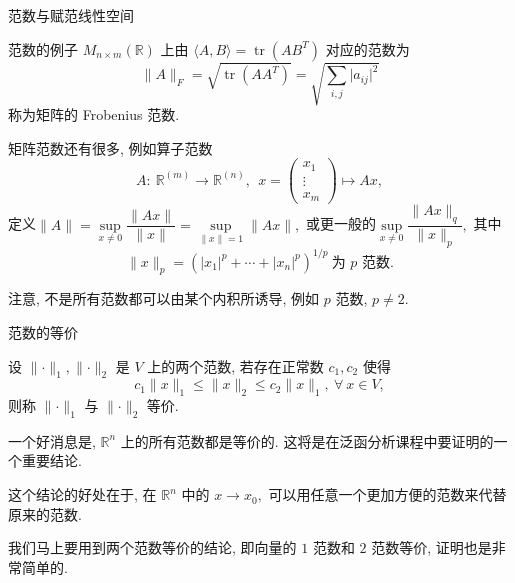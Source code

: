 \begin{frame}{范数与赋范线性空间}

\begin{block}{范数的例子}
$M_{n\times m}(\mathbb{R})$ 上由 $\langle A, B \rangle = \operatorname{tr} (AB^T)$ 对应的范数为
\[\lVert A \rVert_F = \sqrt{\operatorname{tr} (AA^T)} = \sqrt{\sum\limits_{i, j} \lvert a_{ij} \rvert^2}\]
称为矩阵的 Frobenius 范数.
\end{block}

\pause

矩阵范数还有很多, 例如算子范数
\vspace{-1em}
\[
A: ~ \mathbb{R}^{(m)} \rightarrow \mathbb{R}^{(n)}, ~~ x = \begin{pmatrix}
x_1 \\ \vdots \\ x_m
\end{pmatrix} \mapsto Ax,
\]
定义$\lVert A \rVert = \sup\limits_{x\neq 0} \dfrac{\lVert Ax \rVert}{\lVert x \rVert} = \sup\limits_{\lVert x \rVert = 1} \lVert Ax \rVert,$
\pause
或更一般的$\sup\limits_{x\neq 0} \dfrac{\lVert Ax \rVert_q}{\lVert x \rVert_p},$ 其中
\[\lVert x \rVert_p = \left( \lvert x_1 \rvert^p + \cdots + \lvert x_n \rvert^p \right)^{1/p} ~ \text{为 $p$ 范数}.\]

\pause

{\color{red}注意}, 不是所有范数都可以由某个内积所诱导,
\pause
例如 $p$ 范数, $p\neq 2.$

\end{frame}


\graymode
\begin{frame}{范数的等价}

\begin{Def}
设 $\lVert \cdot \rVert_1, \lVert \cdot \rVert_2$ 是 $V$ 上的两个范数, 若存在正常数 $c_1, c_2$ 使得
\[c_1 \lVert x \rVert_1 \leqslant \lVert x \rVert_2 \leqslant c_2 \lVert x \rVert_1, ~ \forall~x \in V,\]
则称 $\lVert \cdot \rVert_1$ 与 $\lVert \cdot \rVert_2$ 等价.
\end{Def}

\pause
\vspace{1em}

一个好消息是, $\mathbb{R}^n$ 上的所有范数都是等价的. 这将是在泛函分析课程中要证明的一个重要结论.

这个结论的好处在于, 在 $\mathbb{R}^n$ 中的 $x \to x_0,$ 可以用任意一个更加方便的范数来代替原来的范数.

\pause
\vspace{1em}

我们马上要用到两个范数等价的结论, 即向量的 $1$ 范数和 $2$ 范数等价, 证明也是非常简单的.


\end{frame}
\normalmode

